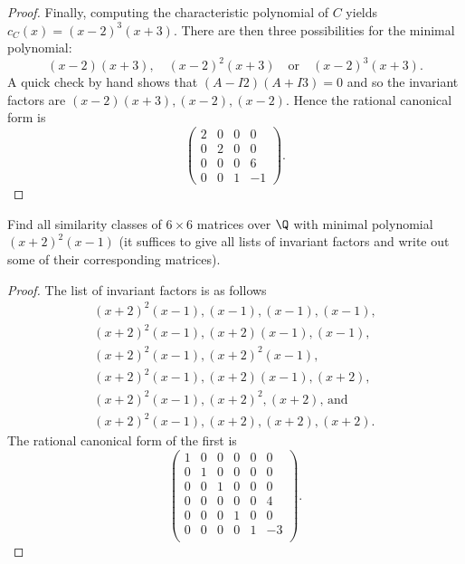 \documentclass[10pt]{amsart}
\begin{document}
\begin{thm}
\begin{proof}
    Finally, computing the characteristic polynomial of $C$ yields $c_C(x) = (x-2)^3(x+3)$.
    There are then three possibilities for the minimal polynomial: $$(x-2)(x+3), \quad (x-2)^2(x+3) \quad \text{or} \quad (x-2)^3(x+3).$$
    A quick check by hand shows that $(A-I2)(A+I3) = 0$ and so the invariant factors are $(x-2)(x+3),(x-2),(x-2).$
    Hence the rational canonical form is 
    $$
    \begin{pmatrix}
      2 & 0 & 0 & 0\\
      0 & 2 & 0 & 0\\
      0 & 0 & 0 & 6\\
      0 & 0 & 1 & -1
    \end{pmatrix}.
    $$
  \end{proof}
\end{thm}

\begin{thm}
  \label{Ex5}
  Find all similarity classes of $6 \times 6$ matrices over $\Q$ with minimal polynomial $(x+2)^2(x-1)$ (it suffices to give all lists of invariant factors and write out some of their corresponding matrices).
  \begin{proof}
    The list of invariant factors is as follows
    \begin{align*}
      (x+2)^2(x-1), (x-1), (x-1), (x-1),\\
      (x+2)^2(x-1), (x+2)(x-1), (x-1),\\
      (x+2)^2(x-1), (x+2)^2(x-1),\\
      (x+2)^2(x-1), (x+2)(x-1), (x+2),\\
      (x+2)^2(x-1), (x+2)^2, (x+2), \, \text{and}\\
      (x+2)^2(x-1), (x+2), (x+2), (x+2).
    \end{align*}
    The rational canonical form of the first is
    $$
    \begin{pmatrix}
      1 & 0 & 0 & 0 & 0 & 0\\
      0 & 1 & 0 & 0 & 0 & 0\\
      0 & 0 & 1 & 0 & 0 & 0\\
      0 & 0 & 0 & 0 & 0 & 4\\
      0 & 0 & 0 & 1 & 0 & 0\\
      0 & 0 & 0 & 0 & 1 & -3\\
    \end{pmatrix}.
    $$
  \end{proof}
\end{thm}
\end{document}
